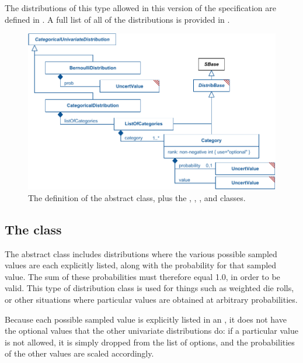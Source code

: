 The distributions of this type allowed in this version of the specification are defined in .  A full list of all of the distributions is provided in .



\begin{figure}[htb]
\includegraphics[width=0.8\linewidth]{figs/categoricalUnivariateDistribution.pdf}
\caption{The definition of the \CategoricalUnivariateDistribution abstract class, plus the \BernoulliDistribution, \CategoricalDistribution, \ListOfCategories, and \Category classes.}
\label{fig:categoricalUnivariateDistribution}
\end{figure}

\subsection{The  class}
\label{CategoricalUnivariateDistribution-class}
\label{categoricalunivariatedistribution-class}

The \CategoricalUnivariateDistribution abstract class includes distributions where the various possible sampled values are each explicitly listed, along with the probability for that sampled value.  The sum of these probabilities must therefore equal 1.0, in order to be valid.  This type of distribution class is used for things such as weighted die rolls, or other situations where particular values are obtained at arbitrary probabilities.

Because each possible sampled value is explicitly listed in an \CategoricalUnivariateDistribution, it does not have the optional \UncertBound values that the other univariate distributions do: if a particular value is not allowed, it is simply dropped from the list of options, and the probabilities of the other values are scaled accordingly.



